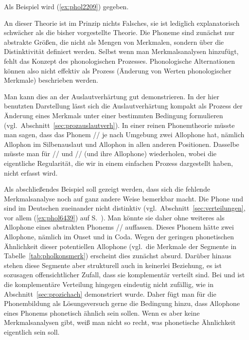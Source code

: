 
Als Beispiel wird (\ref{ex:phol2209}) gegeben.

\begin{exe}
  \ex\label{ex:phol2209}
  \begin{xlist}
  \end{xlist}
\end{exe}

An dieser Theorie ist im Prinzip nichts Falsches, sie ist lediglich explanatorisch schwächer als die bisher vorgestellte Theorie.
Die Phoneme sind zunächst nur abstrakte Größen, die nicht als Mengen von Merkmalen, sondern über die Distinktivität definiert werden.
Selbst wenn man Merkmalsanalysen hinzufügt, fehlt das Konzept des phonologischen Prozesses.
Phonologische Alternationen können also nicht effektiv als Prozess (Änderung von Werten phonologischer Merkmale) beschrieben werden.

Man kann dies an der Auslautverhärtung gut demonstrieren.
In der hier benutzten Darstellung lässt sich die Auslautverhärtung kompakt als Prozess der Änderung eines Merkmals unter einer bestimmten Bedingung formulieren (vgl.\ Abschnitt~\ref{sec:prozauslautverh}).
In einer reinen Phonemtheorie müsste man sagen, dass das Phonem // je nach Umgebung zwei Allophone hat, nämlich Allophon \textipa{[p]} im Silbenauslaut und Allophon \textipa{[b]} in allen anderen Positionen.
Dasselbe müsste man für // und // (und ihre Allophone) wiederholen, wobei die eigentliche Regularität, die wir in einem einfachen Prozess dargestellt haben, nicht erfasst wird.

Als abschließendes Beispiel soll gezeigt werden, dass sich die fehlende Merk\-mals\-ana\-lyse noch auf ganz andere Weise bemerkbar macht.
Die Phone \textipa{[h]} und \textipa{[N]} sind im Deutschen zueinander nicht distinktiv (vgl.\ Abschnitt~\ref{sec:verteilungen}, vor allem (\ref{ex:phol6439}) auf S.~\pageref{ex:phol6439}).
Man könnte sie daher ohne weiteres als Allophone eines abstrakten Phonems // auffassen.
Dieses Phonem hätte zwei Allophone, nämlich \textipa{[h]} im Onset und \textipa{[N]} in Coda.
Wegen der geringen phonetischen Ähnlichkeit dieser potentiellen Allophone (vgl.\ die Merkmale der Segmente in Tabelle~\ref{tab:pholkonsmerk}) erscheint dies zunächst absurd.
Darüber hinaus stehen diese Segmente aber strukturell auch in keinerlei Beziehung, es ist sozusagen offensichtlicher Zufall, dass sie komplementär verteilt sind.
Bei \textipa{[\c{c}]} und \textipa{[X]} ist die komplementäre Verteilung hingegen eindeutig nicht zufällig, wie in Abschnitt~\ref{sec:prozichach} demonstriert wurde.
Daher fügt man für die Phonembildung als Lösungsversuch gerne die Bedingung hinzu, dass Allophone eines Phonems phonetisch ähnlich sein sollen.
Wenn es aber keine Merkmalsanalysen gibt, weiß man nicht so recht, was phonetische Ähnlichkeit eigentlich sein soll.

